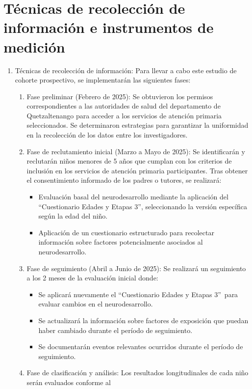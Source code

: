 \documentclass[11pt,letterpaper]{report}
\newcommand{\asq}{“Cuestionario Edades y Etapas 3”}
\begin{document}
\section{Técnicas de recolección de información e instrumentos de medición}
\begin{enumerate}
	\item Técnicas de recolección de información:
	Para llevar a cabo este estudio de cohorte prospectivo, se implementarán
	las siguientes fases:
	\begin{enumerate}
		\item Fase preliminar (Febrero de 2025):
		Se obtuvieron los permisos correspondientes a las autoridades de salud
		del departamento de Quetzaltenango para acceder a los servicios de
		atención primaria seleccionados. Se determinaron estrategias para
		garantizar la uniformidad en la recolección de los datos entre los
		investigadores.
		\item Fase de reclutamiento inicial (Marzo a Mayo de 2025):
		Se identificarán y reclutarán niños menores de 5 años que cumplan con
		los criterios de inclusión en los servicios de atención primaria
		participantes. Tras obtener el consentimiento informado de los padres o
		tutores, se realizará:
			\begin{itemize}
			\item Evaluación basal del neurodesarrollo mediante la aplicación
			del \asq, seleccionando la versión específica según la edad del
			niño.
			\item Aplicación de un cuestionario estructurado para recolectar
			información sobre factores potencialmente asociados al
			neurodesarrollo.
			\end{itemize}
		\item Fase de seguimiento (Abril a Junio de 2025):
		Se realizará un seguimiento a los 2 meses de la evaluación inicial
		donde:
			\begin{itemize}
			\item Se aplicará nuevamente el \asq\ para evaluar cambios en el
			neurodesarrollo.
			\item Se actualizará la información sobre factores de exposición
			que puedan haber cambiado durante el período de seguimiento.
			\item Se documentarán eventos relevantes ocurridos durante el
			período de seguimiento.
			\end{itemize}
		\item Fase de clasificación y análisis:
		Los resultados longitudinales de cada niño serán evaluados conforme al

\end{enumerate}
\end{enumerate}
\end{document}

